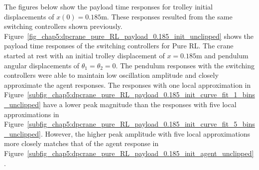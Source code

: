 The figures below show the payload time responses for trolley initial displacements of $x(0)=0.185\si{\meter}$. These responses resulted from the same switching controllers shown previously.
%
Figure~\ref{fig_chap5:dpcrane_pure_RL_payload_0.185_init_unclipped} shows the payload time responses of the switching controllers for Pure RL.
The crane started at rest with an initial trolley displacement of $x=0.185\si{\meter}$ and pendulum angular displacements of $\theta_1=\theta_2=0$. The pendulum responses with the switching controllers were able to maintain low oscillation amplitude and closely approximate the agent responses. The responses with one local approximation in Figure~\ref{subfig_chap5:dpcrane_pure_RL_payload_0.185_init_curve_fit_1_bins_unclipped} have a lower peak magnitude than the responses with five local approximations in Figure~\ref{subfig_chap5:dpcrane_pure_RL_payload_0.185_init_curve_fit_5_bins_unclipped}. However, the higher peak amplitude with five local approximations more closely matches that of the agent response in Figure~\ref{subfig_chap5:dpcrane_pure_RL_payload_0.185_init_agent_unclipped}.
%

